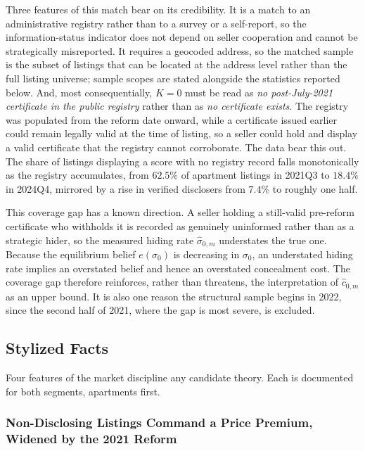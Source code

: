 Three features of this match bear on its credibility. It is a match to an administrative registry
rather than to a survey or a self-report, so the information-status indicator does not depend on
seller cooperation and cannot be strategically misreported. It requires a geocoded address, so the
matched sample is the subset of listings that can be located at the address level rather than the
full listing universe; sample scopes are stated alongside the statistics reported below. And, most
consequentially, $K=0$ must be read as \emph{no post-July-2021 certificate in the public registry}
rather than as \emph{no certificate exists}. The registry was populated from the reform date
onward, while a certificate issued earlier could remain legally valid at the time of listing, so a
seller could hold and display a valid certificate that the registry cannot corroborate. The data
bear this out. The share of listings displaying a score with no registry record falls monotonically
as the registry accumulates, from $62.5\%$ of apartment listings in 2021Q3 to $18.4\%$ in 2024Q4,
mirrored by a rise in verified disclosers from $7.4\%$ to roughly one half.

This coverage gap has a known direction. A seller holding a still-valid pre-reform certificate who
withholds it is recorded as genuinely uninformed rather than as a strategic hider, so the measured
hiding rate $\hat\sigma_{0,m}$ understates the true one. Because the equilibrium belief
$e(\sigma_0)$ is decreasing in $\sigma_0$, an understated hiding rate implies an overstated belief
and hence an overstated concealment cost. The coverage gap therefore reinforces, rather than
threatens, the interpretation of $\hat c_{0,m}$ as an upper bound. It is also one reason the
structural sample begins in 2022, since the second half of 2021, where the gap is most severe, is
excluded.

\subsection{Stylized Facts}
\label{sec:facts}

Four features of the market discipline any candidate theory. Each is documented for both segments,
apartments first.

\subsubsection{Non-Disclosing Listings Command a Price Premium, Widened by the 2021 Reform}
\label{ss:fact1}

